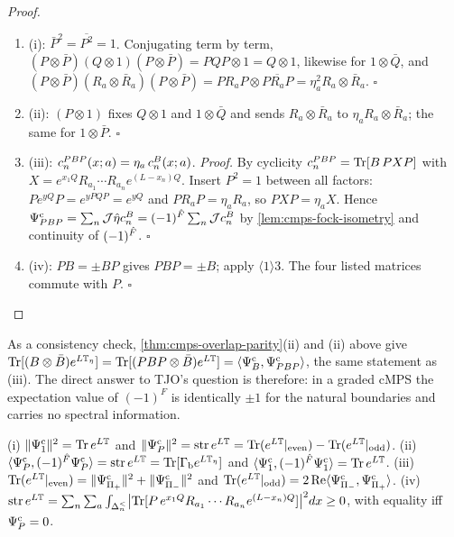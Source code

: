 \begin{proof}
\begin{enumerate}
\item[$\langle1\rangle$1.] (i): $\bar P^2=\overline{P^2}=1$. Conjugating term by term,
$(P\otimes\bar P)(Q\otimes1)(P\otimes\bar P)=PQP\otimes1=Q\otimes1$, likewise for
$1\otimes\bar Q$, and $(P\otimes\bar P)(R_a\otimes\bar R_a)(P\otimes\bar P)=PR_aP\otimes
\overline{PR_aP}=\eta_a^2R_a\otimes\bar R_a$. $\square$
\item[$\langle1\rangle$2.] (ii): $(P\otimes1)$ fixes $Q\otimes1$ and $1\otimes\bar Q$ and sends
$R_a\otimes\bar R_a$ to $\eta_aR_a\otimes\bar R_a$; the same for $1\otimes\bar P$. $\square$
\item[$\langle1\rangle$3.] (iii): $c^{PBP}_n(x;a)=\eta_a\,c^{B}_n(x;a)$. \emph{Proof.} By
cyclicity $c^{PBP}_n=\operatorname{Tr}[B\,PXP]$ with $X=e^{x_1Q}R_{a_1}\cdots R_{a_n}e^{(L-x_n)Q}$. Insert
$P^2=1$ between all factors: $Pe^{yQ}P=e^{yPQP}=e^{yQ}$ and $PR_aP=\eta_aR_a$, so
$PXP=\eta_aX$. Hence $\Psi^{\mathrm c}_{PBP}=\sum_n\mathcal J\hat\eta c^{B}_n=(-1)^{\hat F}\sum_n\mathcal Jc^{B}_n$ by
\cref{lem:cmps-fock-isometry} and continuity of $(-1)^{\hat F}$. $\square$
\item[$\langle1\rangle$4.] (iv): $PB=\pm BP$ gives $PBP=\pm B$; apply $\langle1\rangle$3. The four
listed matrices commute with $P$. $\square$
\end{enumerate}
\end{proof}

As a consistency check, \cref{thm:cmps-overlap-parity}(ii) and (ii) above give
$\operatorname{Tr}[(B\otimes\bar B)e^{L\mathbb T_\eta}]=\operatorname{Tr}[(PBP\otimes\bar B)e^{L\mathbb T}]=\langle\Psi^{\mathrm c}_{B},\Psi^{\mathrm c}_{PBP}\rangle$,
the same statement as (iii). The direct answer to TJO's question is therefore: in a graded
cMPS the expectation value of $(-1)^F$ is identically $\pm1$ for the natural boundaries and
carries no spectral information.

\begin{theorem}
\label{thm:cmps-twisted-supertrace}
(i) $\|\Psi^{\mathrm c}_{1}\|^2=\operatorname{Tr} e^{L\mathbb T}$ and $\|\Psi^{\mathrm c}_{P}\|^2=\operatorname{str} e^{L\mathbb T}=\operatorname{Tr}(e^{L\mathbb T}|_{\mathrm{even}})
-\operatorname{Tr}(e^{L\mathbb T}|_{\mathrm{odd}})$. (ii) $\langle\Psi^{\mathrm c}_{P},(-1)^{\hat F}\Psi^{\mathrm c}_{P}\rangle=\operatorname{str} e^{L\mathbb T}=
\operatorname{Tr}[\Gamma_{\mathrm b} e^{L\mathbb T_\eta}]$ and $\langle\Psi^{\mathrm c}_{1},(-1)^{\hat F}\Psi^{\mathrm c}_{1}\rangle=\operatorname{Tr} e^{L\mathbb T}$. (iii)
$\operatorname{Tr}(e^{L\mathbb T}|_{\mathrm{even}})=\|\Psi^{\mathrm c}_{\Pi_{+}}\|^2+\|\Psi^{\mathrm c}_{\Pi_{-}}\|^2$ and
$\operatorname{Tr}(e^{L\mathbb T}|_{\mathrm{odd}})=2\operatorname{Re}\langle\Psi^{\mathrm c}_{\Pi_{-}},\Psi^{\mathrm c}_{\Pi_{+}}\rangle$. (iv)
$\operatorname{str} e^{L\mathbb T}=\sum_n\sum_a\int_{\Delta^{<}_{n}}\bigl|\operatorname{Tr}[P\,e^{x_1Q}R_{a_1}\cdots
R_{a_n}e^{(L-x_n)Q}]\bigr|^2dx\ge0$, with equality iff $\Psi^{\mathrm c}_{P}=0$.
\end{theorem}

